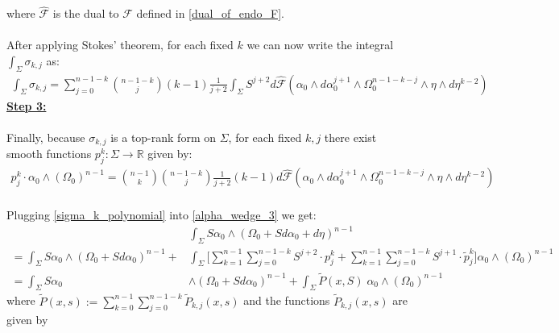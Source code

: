 \documentclass[11pt]{amsart}
\theoremstyle{plain}
\theoremstyle{definition}
\theoremstyle{remark}
\begin{document}
where $\hat{\mathcal{F}}$ is the dual to $\mathcal{F}$ defined in \eqref{dual_of_endo_F}.\\
\\
After applying Stokes' theorem, for each fixed $k$ we can now write the integral $ \int_{\Sigma} \sigma_{k,j}$ as:
\begin{align}\label{sigma_k_final_form}
 \int_{\Sigma} \sigma_{k,j} =  \sum^{n-1-k}_{j=0} \binom{n-1-k}{j}(k-1) \frac{1}{j+2} \int_{\Sigma} S^{j+2} d\hat{\mathcal{F}}(\alpha_0 \wedge d\alpha^{j+1}_0 \wedge \Omega^{n-1-k-j}_0 \wedge \eta \wedge d\eta^{k-2})
\end{align}
\textbf{\underline{Step 3:}}\\
\\
Finally, because $\sigma_{k,j}$ is a top-rank form on $\Sigma$, for each fixed $k,j$
there exist smooth functions $p^k_j: \Sigma \rightarrow \mathbb{R}$ given by:
\begin{align}\label{sigma_k_polynomial}
    p^k_j \cdot \alpha_0 \wedge (\Omega_0)^{n-1} = \binom{n-1}{k} \binom{n-1-k}{j}\frac{1}{j+2}(k-1) 
 d\hat{\mathcal{F}}(\alpha_0 \wedge d\alpha^{j+1}_0 \wedge \Omega^{n-1-k-j}_0 \wedge \eta \wedge d\eta^{k-2}) 
\end{align}
\\
Plugging \eqref{sigma_k_polynomial} into \eqref{alpha_wedge_3} we get:
\begin{align}\label{part_2_final_form}
  &\int_{\Sigma}S\alpha_0 \wedge (\Omega_0 + Sd\alpha_0 + d\eta)^{n-1} \\\nonumber  = \int_{\Sigma} S\alpha_0 \wedge (\Omega_0 +Sd\alpha_0)^{n-1}  + &\int_{\Sigma} \Big[\sum^{n-1}_{k=1} \sum^{n-1-k}_{j=0}  S^{j+2} \cdot p^k_j + \sum^{n-1}_{k=1} \sum^{n-1-k}_{j=0} S^{j+1} \cdot \tilde{p}^k_j\Big] \alpha_0 \wedge (\Omega_0)^{n-1} \\\nonumber = \int_{\Sigma} S\alpha_0 &\wedge (\Omega_0 +Sd\alpha_0)^{n-1}  + \int_{\Sigma} \tilde{P}(x,S) \; \alpha_0 \wedge (\Omega_0)^{n-1}
\end{align}
where $\tilde{P}(x,s):= \sum_{k=0}^{n-1} \sum_{j=0}^{n-1-k} \tilde{P}_{k,j}(x,s)$ and the functions $\tilde{P}_{k,j}(x,s)$ are given by
\end{document}
